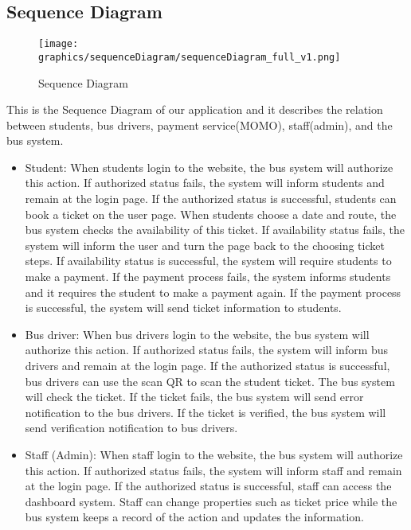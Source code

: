 \subsection{Sequence Diagram}
    \begin{figure}[H]
        \centering
        \texttt{[image: graphics/sequenceDiagram/sequenceDiagram\_full\_v1.png]}
        \caption{Sequence Diagram}
        \label{fig:sequencediagram}
    \end{figure}
\noindent This is the Sequence Diagram of our application and it describes the relation between students, bus drivers, payment service(MOMO), staff(admin), and the bus system.
\begin{itemize}
    \item Student: When students login to the website, the bus system will authorize this action. If authorized status fails, the system will inform students and remain at the login page. If the authorized status is successful, students can book a ticket on the user page. When students choose a date and route, the bus system checks the availability of this ticket. If availability status fails, the system will inform the user and turn the page back to the choosing ticket steps. If availability status is successful, the system will require students to make a payment. If the payment process fails, the system informs students and it requires the student to make a payment again. If the payment process is successful, the system will send ticket information to students. 
    \item Bus driver: When bus drivers login to the website, the bus system will authorize this action. If authorized status fails, the system will inform bus drivers and remain at the login page. If the authorized status is successful, bus drivers can use the scan QR to scan the student ticket. The bus system will check the ticket. If the ticket fails, the bus system will send error notification to the bus drivers. If the ticket is verified, the bus system will send verification notification to bus drivers.
    \item Staff (Admin):  When staff login to the website, the bus system will authorize this action. If authorized status fails, the system will inform staff and remain at the login page. If the authorized status is successful, staff can access the dashboard system. Staff can change properties such as ticket price while the bus system keeps a record of the action and updates the information.
\end{itemize}

